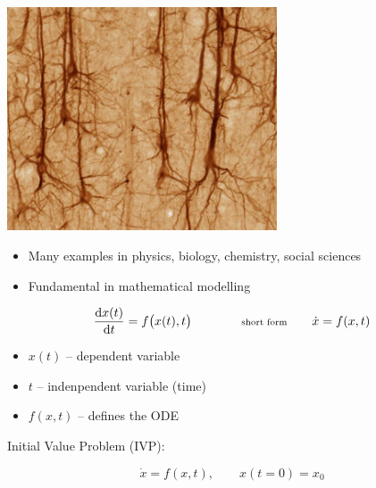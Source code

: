 \begin{frame}
\begin{minipage}{0.48\textwidth}
\begin{center}
  \includegraphics[draft=false,width=0.6\textwidth]{neuron.jpg}
 \end{center}
\end{minipage}
\vspace{2ex}

\begin{itemize}
 \item Many examples in physics, biology, chemistry, social sciences
 \item Fundamental in mathematical modelling
\end{itemize}

\end{frame}



\begin{frame}
 

 $$\frac{\mbox{d} x(t)}{\mbox{d} t} = f\big(x(t) , t\big) \qquad \qquad {\scriptsize \text{short form}} \qquad \dot{x} = f(x,t)
$$

 \begin{itemize}
  \item $x(t)$ -- dependent variable
  \item $t$ -- indenpendent variable (time)
  \item $f(x,t)$ -- defines the ODE
 \end{itemize}

\vspace{4ex}

 Initial Value Problem (IVP):

 $$\dot x = f( x , t ) ,\qquad x(t=0) = x_0$$

\end{frame}


